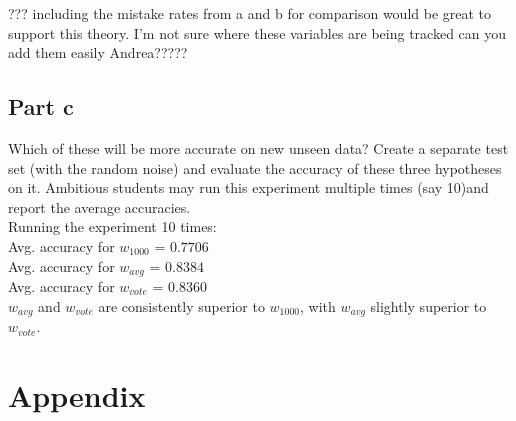 \documentclass{article}
\begin{document}
??? including the mistake rates from a and b for comparison would be great to support this theory. I'm not sure where these variables are being tracked can you add them easily Andrea?????




\clearpage
\subsection*{Part c}

Which of these will be more accurate on new unseen data? Create a separate test set (with the random noise) and evaluate the accuracy of these three hypotheses on it. Ambitious students may run this experiment multiple times (say 10)and report the average accuracies.
\\
Running the experiment 10 times: \\
Avg. accuracy for $w_{1000}$ = $0.7706$ \\
Avg. accuracy for $w_{avg}$ = $0.8384$ \\
Avg. accuracy for $w_{vote}$ = $0.8360$ \\

\noindent $w_{avg}$ and $w_{vote}$ are consistently superior to $w_{1000}$, with $w_{avg}$ slightly superior to $w_{vote}$.

\clearpage
\section{Appendix}





\end{document}
